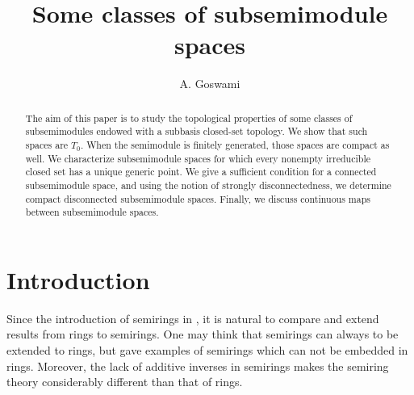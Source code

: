 \documentclass[12pt,english]{smfart}
\theoremstyle{definition}
\begin{document}
\author{A. Goswami}
\address{
[1] Department of Mathematics and Applied Mathematics, University of Johannesburg, P.O. Box 524, Auckland Park 2006, South Africa. [2] National Institute for Theoretical and Computational Sciences (NITheCS), South Africa.}

\title{Some classes of subsemimodule spaces}







\begin{abstract}
The aim of this paper is to study the topological properties of some classes of subsemimodules  endowed with a subbasis closed-set topology. We show that such spaces are $T_0$. When the semimodule is finitely generated, those spaces are compact as well. We characterize subsemimodule spaces for which every nonempty irreducible closed set has a unique generic point. We give a sufficient condition for a connected subsemimodule space, and using the notion of strongly disconnectedness, we determine compact disconnected subsemimodule spaces. Finally, we discuss continuous maps between subsemimodule spaces. 
\end{abstract}
\maketitle

\section{Introduction}

Since the introduction of semirings in \cite{V34}, it is natural to compare and extend results from rings to semirings. One  may think that  semirings can always to be extended to rings, but \cite{V39} gave examples of semirings which can not be embedded in rings. Moreover, the lack of additive inverses in semirings makes the semiring theory considerably different than that of rings.
\end{document}
